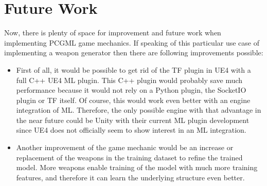 \documentclass[MGS,Master,english]{twbook}%
\begin{document}
\section{Future Work}
Now, there is plenty of space for improvement and future work when implementing \ac{PCGML} game mechanics. If speaking of this particular use case of implementing a weapon generator then there are following improvements possible:
\begin{itemize}
	\item First of all, it would be possible to get rid of the \ac{TF} plugin in \ac{UE4} with a full C++ \ac{UE4} \ac{ML} plugin. This C++ plugin would probably save much performance because it would not rely on a Python plugin, the SocketIO plugin or \ac{TF} itself. Of course, this would work even better with an engine integration of \ac{ML}. Therefore, the only possible engine with that advantage in the near future could be Unity with their current \ac{ML} plugin development since \ac{UE4} does not officially seem to show interest in an \ac{ML} integration. 
	\item Another improvement of the game mechanic would be an increase or replacement of the weapons in the training dataset to refine the trained model. More weapons enable training of the model with much more training features, and therefore it can learn the underlying structure even better. 
	

\end{itemize}
\end{document}
